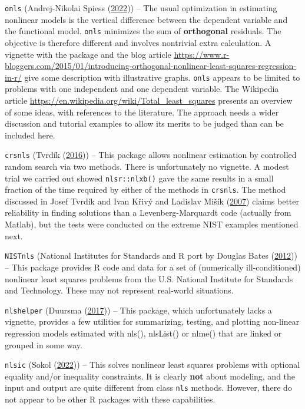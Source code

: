 \documentclass[
]{article}
\begin{document}
\texttt{onls} (Andrej-Nikolai Spiess
(\protect\hyperlink{ref-R-onls-manual}{2022})) -- The usual optimization
in estimating nonlinear models is the vertical difference between the
dependent variable and the functional model. \texttt{onls} minimizes the
sum of \textbf{orthogonal} residuals. The objective is therefore
different and involves nontrivial extra calculation. A vignette with the
package and the blog article
\url{https://www.r-bloggers.com/2015/01/introducing-orthogonal-nonlinear-least-squares-regression-in-r/}
give some description with illustrative graphs. \texttt{onls} appears to
be limited to problems with one independent and one dependent variable.
The Wikipedia article
\url{https://en.wikipedia.org/wiki/Total_least_squares} presents an
overview of some ideas, with references to the literature. The approach
needs a wider discussion and tutorial examples to allow its merits to be
judged than can be included here.

\texttt{crsnls} (Tvrdík (\protect\hyperlink{ref-R-crsnls-manual}{2016}))
-- This package allows nonlinear estimation by controlled random search
via two methods. There is unfortunately no vignette. A modest trial we
carried out showed \texttt{nlsr::nlxb()} gave the same results in a
small fraction of the time required by either of the methods in
\texttt{crsnls}. The method discussed in Josef Tvrdík and Ivan Křivý and
Ladislav Mišík (\protect\hyperlink{ref-tvrdik2007}{2007}) claims better
reliability in finding solutions than a Levenberg-Marquardt code
(actually from Matlab), but the tests were conducted on the extreme NIST
examples mentioned next.

\texttt{NISTnls} (National Institutes for Standards and R port by
Douglas Bates (\protect\hyperlink{ref-NISTnls-manual}{2012})) -- This
package provides R code and data for a set of (numerically
ill-conditioned) nonlinear least squares problems from the U.S. National
Institute for Standards and Technology. These may not represent
real-world situations.

\texttt{nlshelper} (Duursma
(\protect\hyperlink{ref-nlshelper-manual}{2017})) -- This package, which
unfortunately lacks a vignette, provides a few utilities for
summarizing, testing, and plotting non-linear regression models
estimated with nls(), nlsList() or nlme() that are linked or grouped in
some way.

\texttt{nlsic} (Sokol (\protect\hyperlink{ref-nlsic-manual}{2022})) --
This solves nonlinear least squares problems with optional equality
and/or inequality constraints. It is clearly \textbf{not} about
modeling, and the input and output are quite different from class
\texttt{nls} methods. However, there do not appear to be other R
packages with these capabilities.
\end{document}
